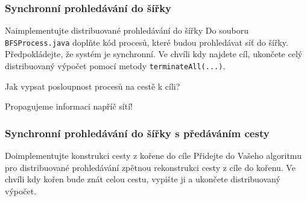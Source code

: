\documentclass[usenames,dvipsnames,9pt]{beamer}
\begin{document}
{
\begin{frame}[fragile]
\frametitle{Synchronní prohledávání do šířky}

  \begin{block}{Naimplementujte distribuované prohledávání do šířky}
    Do souboru \texttt{BFSProcess.java} doplňte kód procesů, které budou prohledávat síť do šířky. Předpokládejte, že systém je synchronní. Ve chvíli kdy najdete cíl, ukončete celý distribuovaný výpočet pomocí metody \texttt{terminateAll(...)}.
  \end{block}

\end{frame}
}

\begin{frame}

\begin{center}
\Large Jak vypsat posloupnost procesů na cestě k cíli?
\end{center}

\pause\vspace{0.8em}

\hfill Propagujeme informaci napříč sítí!


\end{frame}

{
\begin{frame}[fragile]
\frametitle{Synchronní prohledávání do šířky s předáváním cesty}

  \begin{block}{Doimplementujte konstrukci cesty z kořene do cíle}
    Přidejte do Vašeho algoritmu pro distribuované prohledávání zpětnou rekonstrukci cesty z cíle do kořenu. Ve chvíli kdy kořen bude znát celou cestu, vypište ji a ukončete distribuovaný výpočet.
  \end{block}

\end{frame}
}
\end{document}
